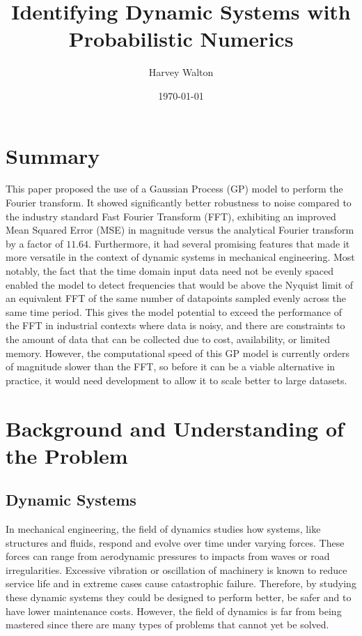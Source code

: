 \documentclass[12pt]{article}
\title{Identifying Dynamic Systems with Probabilistic Numerics}
\author{Harvey Walton}
\date{\today}
\begin{document}

    \thispagestyle{empty}
    

    \section{Summary}
    This paper proposed the use of a Gaussian Process (GP) model to perform the Fourier transform.
    It showed significantly better robustness to noise compared to the industry standard Fast Fourier Transform (FFT), exhibiting an improved Mean Squared Error (MSE) in magnitude versus the analytical Fourier transform by a factor of $11.64$.
    Furthermore, it had several promising features that made it more versatile in the context of dynamic systems in mechanical engineering.
    Most notably, the fact that the time domain input data need not be evenly spaced enabled the model to detect frequencies that would be above the Nyquist limit of an equivalent FFT of the same number of datapoints sampled evenly across the same time period.
    This gives the model potential to exceed the performance of the FFT in industrial contexts where data is noisy, and there are constraints to the amount of data that can be collected due to cost, availability, or limited memory.
    However, the computational speed of this GP model is currently orders of magnitude slower than the FFT, so before it can be a viable alternative in practice, it would need development to allow it to scale better to large datasets.

    \printnomenclature

    \newpage
    \tableofcontents
    \newpage


    \section{Background and Understanding of the Problem}

    \subsection{Dynamic Systems}
    In mechanical engineering, the field of dynamics studies how systems, like structures and fluids, respond and evolve over time under varying forces.
    These forces can range from aerodynamic pressures to impacts from waves or road irregularities.
    Excessive vibration or oscillation of machinery is known to reduce service life and in extreme cases cause catastrophic failure.
    Therefore, by studying these dynamic systems they could be designed to perform better, be safer and to have lower maintenance costs.
    However, the field of dynamics is far from being mastered since there are many types of problems that cannot yet be solved.
\end{document}
